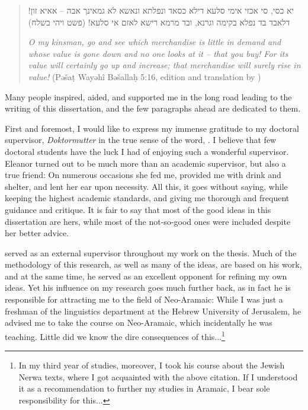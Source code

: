 


\begin{quote}

\begin{hebrew}
יא כסי, סי אכזי אימי סלעא דילא כסאד ונפלתא ונאשא לא גמאינך אבה – אאיא זון! דלאבד בד נפלא בקימה וגרנא, ובד מרמא רישא לאזם אי סלעא! (פשט ויהי בשלח)
\end{hebrew}

\textit{O my kinsman, go and see which merchandise is little in demand and whose value is gone down and no one looks at it – that you buy! For its value will certainly go up and increase; that merchandise will surely rise in value!} (Pəšaṭ Wayəhî Bəšallaḥ 5:16, edition and translation by \cite{SabarNerwa})

\end{quote}



Many people inspired, aided, and supported me in the long road leading to the writing of this dissertation, and the few paragraphs ahead are dedicated to them. %

First and foremost, I would like to express my immense gratitude to my doctoral supervisor, \textit{Doktormutter} in the true sense of the word, . I believe that few doctoral students have the luck I had of enjoying such a wonderful supervisor. Eleanor turned out to be much more than an academic supervisor, but also a true friend: On numerous occasions she fed me, provided me with drink and shelter, and lent her ear upon necessity. All this, it goes without saying, while keeping the highest academic standards, and giving me thorough and frequent guidance and critique. It is fair to say that most of the good ideas in this dissertation are hers, while most of the not-so-good ones were included despite her better advice. 

 served as an external supervisor throughout my work on the thesis. Much of the methodology of this research, as well as many of the ideas, are based on his work, and at the same time, he served as an excellent opponent for refining my own ideas. Yet his influence on my research goes much further back, as in fact he is responsible for attracting me to the field of Neo-Aramaic: While I was just a freshman of the linguistics department at the Hebrew University of Jerusalem, he advised me to take the course on Neo-Aramaic, which incidentally he was teaching. Little did we know the dire consequences of this...\footnote{In my third year of studies, moreover, I took his course about the Jewish Nerwa texts, where I got acquainted with the above citation. If I understood it as a recommendation to further my studies in Aramaic, I bear sole responsibility for this...}

